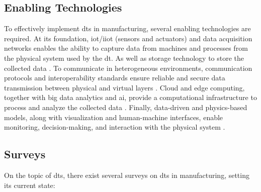 \subsection{Enabling Technologies}
To effectively implement \ac{dt}s in manufacturing, several enabling technologies are required.
At its foundation, \ac{iot}/\ac{iiot} (sensors and actuators) and data acquisition networks enables the ability to capture data from machines and processes from the physical system used by the \ac{dt}.
As well as storage technology to store the collected data \cite{TAO2019653, Fuller9103025}.
To communicate in heterogeneous environments, communication protocols and interoperability standards ensure reliable and secure data transmission between physical and virtual layers \cite{JONES202036}.
Cloud and edge computing, together with big data analytics and \ac{ai}, provide a computational infrastructure to process and analyze the collected data \cite{TAO2019653,Wang10090432}.
Finally, data-driven and physics-based models, along with visualization and human-machine interfaces, enable monitoring, decision-making, and interaction with the physical system \cite{Rasheed8972429}.

\subsection{Surveys}
On the topic of \ac{dt}s, there exist several surveys on \ac{dt}s in manufacturing, setting its current state: 


